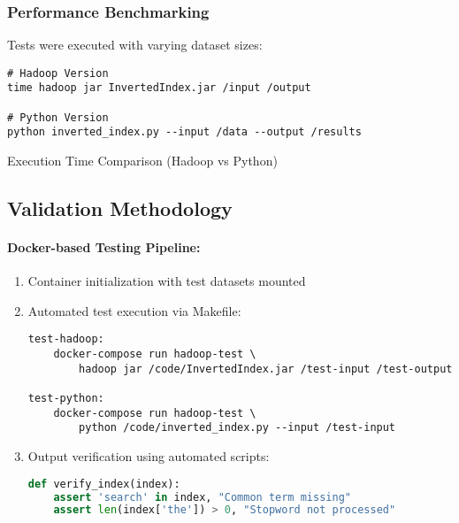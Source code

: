 \subsubsection{Performance Benchmarking}
Tests were executed with varying dataset sizes:

\begin{lstlisting}[style=bashstyle,caption={Test Execution Command},label={lst:inverted-test}]
# Hadoop Version
time hadoop jar InvertedIndex.jar /input /output

# Python Version
python inverted_index.py --input /data --output /results
\end{lstlisting}

Execution Time Comparison (Hadoop vs Python)

\subsection{Validation Methodology}\label{subsec:validation-methodology}

\paragraph{Docker-based Testing Pipeline:}
\begin{enumerate}
    \item Container initialization with test datasets mounted
    \item Automated test execution via Makefile:

    \begin{lstlisting}[style=makefilestyle,caption={Makefile Test Targets},label={lst:docker-run}]
test-hadoop:
    docker-compose run hadoop-test \
        hadoop jar /code/InvertedIndex.jar /test-input /test-output

test-python:
    docker-compose run hadoop-test \
        python /code/inverted_index.py --input /test-input
    \end{lstlisting}

    \item Output verification using automated scripts:

    \begin{lstlisting}[language=python,caption={Verification Script},label={lst:python-test}]
def verify_index(index):
    assert 'search' in index, "Common term missing"
    assert len(index['the']) > 0, "Stopword not processed"
    \end{lstlisting}
\end{enumerate}

